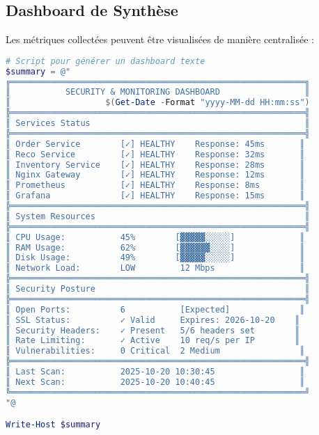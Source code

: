 \subsection{Dashboard de Synthèse}

Les métriques collectées peuvent être visualisées de manière centralisée :

\begin{lstlisting}[language=PowerShell, caption=Génération d'un Rapport de Synthèse]
# Script pour générer un dashboard texte
$summary = @"
╔═══════════════════════════════════════════════════════════╗
║           SECURITY & MONITORING DASHBOARD                 ║
║                   $(Get-Date -Format "yyyy-MM-dd HH:mm:ss")                  ║
╠═══════════════════════════════════════════════════════════╣
║ Services Status                                           ║
╠═══════════════════════════════════════════════════════════╣
║ Order Service        [✓] HEALTHY    Response: 45ms       ║
║ Reco Service         [✓] HEALTHY    Response: 32ms       ║
║ Inventory Service    [✓] HEALTHY    Response: 28ms       ║
║ Nginx Gateway        [✓] HEALTHY    Response: 12ms       ║
║ Prometheus           [✓] HEALTHY    Response: 8ms        ║
║ Grafana              [✓] HEALTHY    Response: 15ms       ║
╠═══════════════════════════════════════════════════════════╣
║ System Resources                                          ║
╠═══════════════════════════════════════════════════════════╣
║ CPU Usage:           45%        [▓▓▓▓▓░░░░░]             ║
║ RAM Usage:           62%        [▓▓▓▓▓▓░░░░]             ║
║ Disk Usage:          49%        [▓▓▓▓▓░░░░░]             ║
║ Network Load:        LOW         12 Mbps                 ║
╠═══════════════════════════════════════════════════════════╣
║ Security Posture                                          ║
╠═══════════════════════════════════════════════════════════╣
║ Open Ports:          6           [Expected]              ║
║ SSL Status:          ✓ Valid     Expires: 2026-10-20    ║
║ Security Headers:    ✓ Present   5/6 headers set        ║
║ Rate Limiting:       ✓ Active    10 req/s per IP        ║
║ Vulnerabilities:     0 Critical  2 Medium                ║
╠═══════════════════════════════════════════════════════════╣
║ Last Scan:           2025-10-20 10:30:45                 ║
║ Next Scan:           2025-10-20 10:40:45                 ║
╚═══════════════════════════════════════════════════════════╝
"@

Write-Host $summary
\end{lstlisting}

